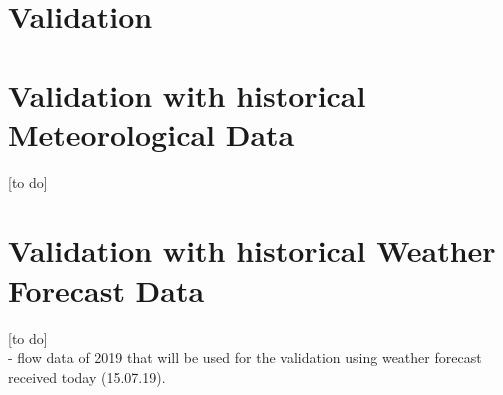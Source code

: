 \section{Validation}

\section{Validation with historical Meteorological Data}
[to do]\\

\section{Validation with historical Weather Forecast Data}
[to do]\\

- flow data of 2019 that will be used for the validation using weather forecast received today (15.07.19).\\